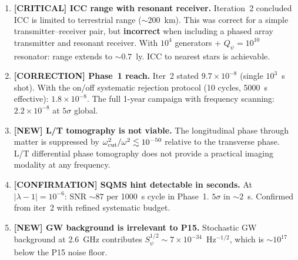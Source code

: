 \documentclass[11pt]{article}
\newcommand{\ee}[1]{\times 10^{#1}}
\newcommand{\lam}{\lambda}
\begin{document}
\begin{enumerate}

\item \textbf{[CRITICAL] ICC range with resonant receiver.}
Iteration~2 concluded ICC is limited to terrestrial range
($\sim 200$~km). This was correct for a simple transmitter--receiver
pair, but \textbf{incorrect} when including a phased array transmitter
and resonant receiver. With $10^4$ generators + $Q_\psi = 10^{10}$
resonator: range extends to $\sim 0.7$~ly. ICC to nearest stars
is achievable.

\item \textbf{[CORRECTION] Phase~1 reach.}
Iter~2 stated $9.7\ee{-8}$ (single $10^3$~s shot). With the
on/off systematic rejection protocol (10 cycles, 5000~s effective):
$1.8\ee{-8}$. The full 1-year campaign with frequency scanning:
$2.2\ee{-8}$ at $5\sigma$ global.

\item \textbf{[NEW] L/T tomography is not viable.}
The longitudinal phase through matter is suppressed by
$\omega_{\rm cut}^2/\omega^2 \lesssim 10^{-50}$ relative to the
transverse phase. L/T differential phase tomography does not
provide a practical imaging modality at any frequency.

\item \textbf{[CONFIRMATION] SQMS hint detectable in seconds.}
At $|\lam-1| = 10^{-6}$: SNR $\sim 87$ per 1000~s cycle in
Phase~1. $5\sigma$ in $\sim 2$~s. Confirmed from iter~2 with
refined systematic budget.

\item \textbf{[NEW] GW background is irrelevant to P15.}
Stochastic GW background at 2.6~GHz contributes
$S_\psi^{1/2} \sim 7\ee{-34}$~Hz$^{-1/2}$, which is $\sim 10^{17}$
below the P15 noise floor.

\end{enumerate}
\end{document}
